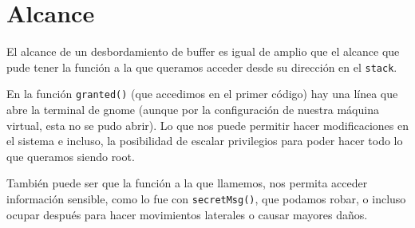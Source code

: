 \section{Alcance}
El alcance de un desbordamiento de buffer es igual de amplio que el alcance que pude tener la función a la que queramos acceder desde su dirección en el  \texttt{stack}.

En la función \texttt{granted()} (que accedimos en el primer código) hay una línea que abre la terminal de gnome (aunque por la configuración de nuestra máquina virtual, esta no se pudo abrir). Lo que nos puede permitir hacer modificaciones en el sistema e incluso, la posibilidad de escalar privilegios para poder hacer todo lo que queramos siendo root.

También puede ser que la función a la que llamemos, nos permita acceder información sensible, como lo fue con \texttt{secretMsg()}, que podamos robar, o incluso ocupar después para hacer movimientos laterales o causar mayores daños.